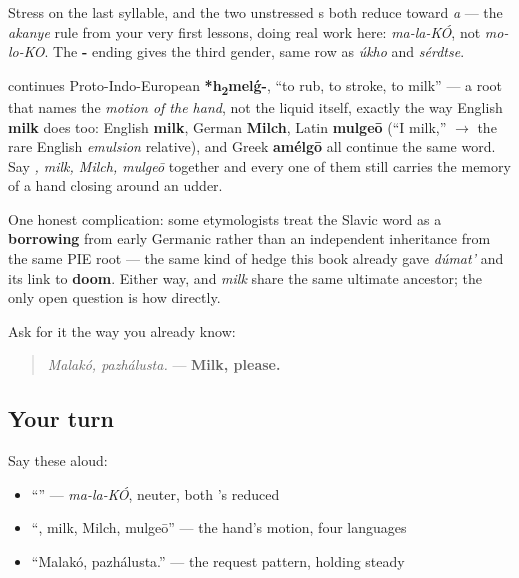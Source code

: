 Stress on the last syllable, and the two unstressed \textbf{}s both reduce toward \emph{a} — the \emph{akanye} rule from your very first lessons, doing real work here: \emph{ma-la-KÓ}, not \emph{mo-lo-KO}. The \textbf{-} ending gives the third gender, same row as \emph{úkho} and \emph{sérdtse}.

\begin{cousinweb}
\textbf{} continues Proto-Indo-European \textbf{*h\textsubscript{2}melǵ-}, \textquotedblleft{}to rub, to stroke, to milk\textquotedblright{} — a root that names the \emph{motion of the hand}, not the liquid itself, exactly the way English \textbf{milk} does too: English \textbf{milk}, German \textbf{Milch}, Latin \textbf{mulgeō} (\textquotedblleft{}I milk,\textquotedblright{} $\to$ the rare English \emph{emulsion} relative), and Greek \textbf{amélgō} all continue the same word. Say \emph{, milk, Milch, mulgeō} together and every one of them still carries the memory of a hand closing around an udder.

One honest complication: some etymologists treat the Slavic word as a \textbf{borrowing} from early Germanic rather than an independent inheritance from the same PIE root — the same kind of hedge this book already gave \emph{dúmat'} and its link to \textbf{doom}. Either way, \emph{} and \emph{milk} share the same ultimate ancestor; the only open question is how directly.

Ask for it the way you already know:

\begin{quote}
\emph{Malakó, pazhálusta.} — \textbf{Milk, please.}
\end{quote}
\end{cousinweb}

\subsection*{Your turn}
Say these aloud:

\begin{itemize}
\raggedright
  \item \textquotedblleft{}\textquotedblright{} — \emph{ma-la-KÓ}, neuter, both 's reduced
  \item \textquotedblleft{}, milk, Milch, mulgeō\textquotedblright{} — the hand's motion, four languages
  \item \textquotedblleft{}Malakó, pazhálusta.\textquotedblright{} — the request pattern, holding steady
\end{itemize}

